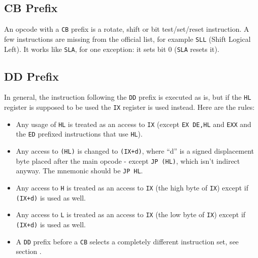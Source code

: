 \subsection{CB Prefix \cite{gerton}}
\label{z80_undocumented_prefix_cb}

An opcode with a {\tt CB} prefix is a rotate, shift or bit test/set/reset instruction. A few instructions are missing from the official list, for example {\tt SLL} (Shift Logical Left). It works like {\tt SLA}, for one exception: it sets bit 0 ({\tt SLA} resets it).


\subsection{DD Prefix \cite{gerton}}

In general, the instruction following the {\tt DD} prefix is executed as is, but if the {\tt HL} register is supposed to be used the {\tt IX} register is used instead. Here are the rules:

\begin{itemize}[topsep=1pt,itemsep=1pt]
	\item Any usage of {\tt HL} is treated as an access to {\tt IX} (except {\tt EX DE,HL} and {\tt EXX} and the {\tt ED} prefixed instructions that use {\tt HL}).
	
	\item Any access to {\tt (HL)} is changed to {\tt (IX+d)}, where ``d'' is a signed displacement byte placed after the main opcode - except {\tt JP (HL)}, which isn't indirect anyway. The mnemonic should be {\tt JP HL}.
	
	\item Any access to {\tt H} is treated as an access to {\tt IX\High} (the high byte of {\tt IX}) except if {\tt (IX+d)} is used as well.
	
	\item Any access to {\tt L} is treated as an access to {\tt IX\Low} (the low byte of {\tt IX}) except if {\tt (IX+d)} is used as well.
	
	\item A {\tt DD} prefix before a {\tt CB} selects a completely different instruction set, see section {}.
\end{itemize}

